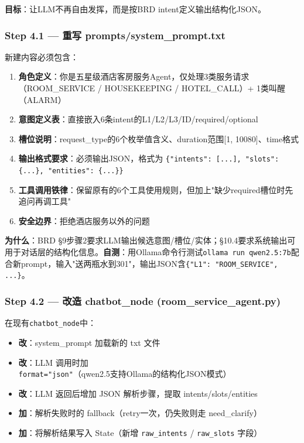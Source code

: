 \documentclass[12pt,a4paper]{ctexart}
\begin{document}
\textbf{目标}：让LLM不再自由发挥，而是按BRD intent定义输出结构化JSON。

\subsubsection*{Step 4.1 — 重写 prompts/system\_prompt.txt}

新建内容必须包含：

\begin{enumerate}
    \item \textbf{角色定义}：你是五星级酒店客房服务Agent，仅处理3类服务请求（ROOM\_SERVICE / HOUSEKEEPING / HOTEL\_CALL）+ 1类叫醒（ALARM）
    \item \textbf{意图定义表}：直接嵌入6条intent的L1/L2/L3/ID/required/optional
    \item \textbf{槽位说明}：request\_type的6个枚举值含义、duration范围[1, 10080]、time格式
    \item \textbf{输出格式要求}：必须输出JSON，格式为 \texttt{\{"intents": [...], "slots": \{...\}, "entities": \{...\}\}}
    \item \textbf{工具调用铁律}：保留原有的6个工具使用规则，但加上"缺少required槽位时先追问再调工具"
    \item \textbf{安全边界}：拒绝酒店服务以外的问题
\end{enumerate}

\textbf{为什么}：BRD §9步骤2要求LLM输出候选意图/槽位/实体；§10.4要求系统输出可用于对话层的结构化信息。\textbf{自测}：用Ollama命令行测试\texttt{ollama run qwen2.5:7b}配合新prompt，输入"送两瓶水到301"，输出JSON含\texttt{\{"L1": "ROOM\_SERVICE", ...\}}。

\subsubsection*{Step 4.2 — 改造 chatbot\_node (room\_service\_agent.py)}

在现有\texttt{chatbot\_node}中：

\begin{itemize}
    \item \textbf{改}：system\_prompt 加载新的 txt 文件
    \item \textbf{改}：LLM 调用时加 \texttt{format="json"}（qwen2.5支持Ollama的结构化JSON模式）
    \item \textbf{改}：LLM 返回后增加 JSON 解析步骤，提取 intents/slots/entities
    \item \textbf{加}：解析失败时的 fallback（retry一次，仍失败则走 need\_clarify）
    \item \textbf{加}：将解析结果写入 State（新增 \texttt{raw\_intents} / \texttt{raw\_slots} 字段）
\end{itemize}
\end{document}

